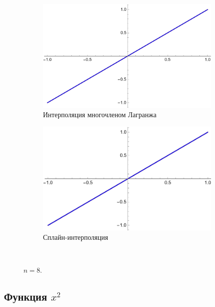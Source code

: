\documentclass[12pt, a4paper]{article}
\begin{document}
	
	\begin{figure}[H]
		\centering
		\begin{subfigure}{0.4\textwidth}
			\includegraphics[width=\textwidth]{1_l8}
			\caption{Интерполяция многочленом Лагранжа}
		\end{subfigure}
		\hfill
		\begin{subfigure}{0.4\textwidth}
			\includegraphics[width=\textwidth]{1_s8}
			\caption{Сплайн-интерполяция}
		\end{subfigure}
		\hfill
		\\[0.5cm]
		\caption{$n = 8$.}
		\label{fig:figures}
	\end{figure}
	
	
	\subsection{Функция $x^2$}
	
\end{document}
